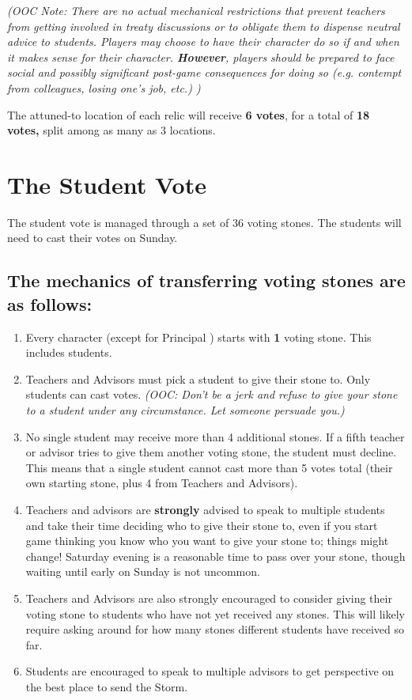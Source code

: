 \documentclass[green]{GL2020}
\begin{document}
\emph{(OOC Note: There are no actual mechanical restrictions that prevent teachers from getting involved in treaty discussions or to obligate them to dispense neutral advice to students. Players may choose to have their character do so if and when it makes sense for their character. \textbf{However}, players should be prepared to face social and possibly significant post-game consequences for doing so (e.g. contempt from colleagues, losing one's job, etc.) )}

The attuned-to location of each relic will receive \textbf{6 votes}, for a total of \textbf{18 votes,} split among as many as 3 locations. 

\section*{The Student Vote}
The student vote is managed through a set of 36 voting stones. The students will need to cast their votes on Sunday.

\subsection*{The mechanics of transferring voting stones are as follows:}

\begin{enumerate}
\item Every character (except for Principal \cPrincipal{}) starts with \textbf{1} voting stone. This includes students.
\item Teachers and Advisors must pick a student to give their stone to. Only students can cast votes. \emph{(OOC: Don't be a jerk and refuse to give your stone to a student under any circumstance. Let someone persuade you.)}
\item No single student may receive more than 4 additional stones. If a fifth teacher or advisor tries to give them another voting stone, the student must decline. This means that a single student cannot cast more than 5 votes total (their own starting stone, plus 4 from Teachers and Advisors).
\item Teachers and advisors are \textbf{strongly} advised to speak to multiple students and take their time deciding who to give their stone to, even if you start game thinking you know who you want to give your stone to; things might change! Saturday evening is a reasonable time to pass over your stone, though waiting until early on Sunday is not uncommon. 
\item Teachers and Advisors are also strongly encouraged to consider giving their voting stone to students who have not yet received any stones. This will likely require asking around for how many stones different students have received so far.
\item Students are encouraged to speak to multiple advisors to get perspective on the best place to send the Storm.
\end{enumerate}
\end{document}

